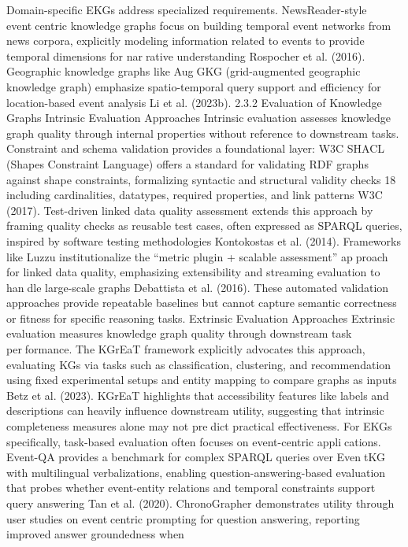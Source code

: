 Domain-specific EKGs address specialized requirements. NewsReader-style eventcentric knowledge graphs focus on building temporal event networks from news corpora,
explicitly modeling information related to events to provide temporal dimensions for narrative understanding Rospocher et al. (2016). Geographic knowledge graphs like AugGKG (grid-augmented geographic knowledge graph) emphasize spatio-temporal query
support and efficiency for location-based event analysis Li et al. (2023b).
2.3.2 Evaluation of Knowledge Graphs
Intrinsic Evaluation Approaches
Intrinsic evaluation assesses knowledge graph quality through internal properties without
reference to downstream tasks. Constraint and schema validation provides a foundational
layer: W3C SHACL (Shapes Constraint Language) offers a standard for validating RDF
graphs against shape constraints, formalizing syntactic and structural validity checks
18
including cardinalities, datatypes, required properties, and link patterns W3C (2017).
Test-driven linked data quality assessment extends this approach by framing quality
checks as reusable test cases, often expressed as SPARQL queries, inspired by software
testing methodologies Kontokostas et al. (2014).
Frameworks like Luzzu institutionalize the “metric plugin + scalable assessment” approach for linked data quality, emphasizing extensibility and streaming evaluation to handle large-scale graphs Debattista et al. (2016). These automated validation approaches
provide repeatable baselines but cannot capture semantic correctness or fitness for specific
reasoning tasks.
Extrinsic Evaluation Approaches
Extrinsic evaluation measures knowledge graph quality through downstream task performance. The KGrEaT framework explicitly advocates this approach, evaluating KGs
via tasks such as classification, clustering, and recommendation using fixed experimental
setups and entity mapping to compare graphs as inputs Betz et al. (2023). KGrEaT
highlights that accessibility features like labels and descriptions can heavily influence
downstream utility, suggesting that intrinsic completeness measures alone may not predict practical effectiveness.
For EKGs specifically, task-based evaluation often focuses on event-centric applications. Event-QA provides a benchmark for complex SPARQL queries over EventKG with multilingual verbalizations, enabling question-answering-based evaluation that
probes whether event-entity relations and temporal constraints support query answering
Tan et al. (2020). ChronoGrapher demonstrates utility through user studies on eventcentric prompting for question answering, reporting improved answer groundedness when
